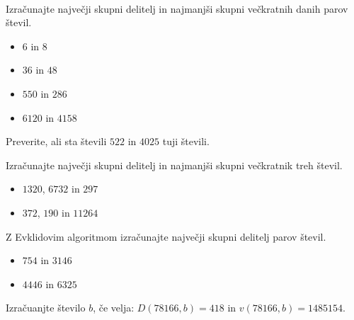         

        ~\\
            \begin{naloga}
                Izračunajte največji skupni delitelj in najmanjši skupni večkratnih danih parov števil.
                \begin{itemize}
                    \item $6$ in $8$ 
                    \item $36$ in $48$ 
                    \item $550$ in $286$ 
                    \item $6120$ in $4158$ 
                \end{itemize}
            \end{naloga}
        
            \begin{naloga}
                Preverite, ali sta števili $522$ in $4025$ tuji števili. 
            \end{naloga}

            \begin{naloga}
                Izračunajte največji skupni delitelj in najmanjši skupni večkratnik treh števil.
                \begin{itemize}
                    \item $1320$, $6732$ in $297$ 
                    \item $372$, $190$ in $11264$ 
                \end{itemize}
            \end{naloga}
        
            \begin{naloga}
                Z Evklidovim algoritmom izračunajte največji skupni delitelj parov števil.
                \begin{itemize}
                    \item $754$ in $3146$ 
                    \item $4446$ in $6325$ 
                \end{itemize}
            \end{naloga}

            \begin{naloga}
                Izračuanjte število $b$, če velja: $D(78 166, b)=418$ in $v(78 166, b)=1 485 154$. 
            \end{naloga}

